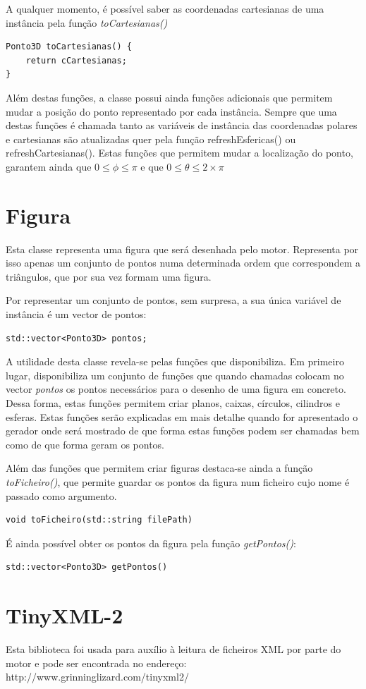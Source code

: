 A qualquer momento, é possível saber as coordenadas cartesianas de uma instância pela função \textit{toCartesianas()}

\begin{Verbatim}
Ponto3D toCartesianas() {
	return cCartesianas;
}
\end{Verbatim}

Além destas funções, a classe possui ainda funções adicionais que permitem mudar a posição do ponto representado por cada instância. Sempre que uma destas funções é chamada tanto as variáveis de instância das coordenadas polares e cartesianas são atualizadas quer pela função refreshEsfericas() ou refreshCartesianas(). Estas funções que permitem mudar a localização do ponto, garantem ainda que $0 \leq \phi \leq \pi$ e que $0 \leq \theta \leq 2 \times \pi$

\newpage

\section{Figura}

Esta classe representa uma figura que será desenhada pelo motor. Representa por isso apenas um conjunto de pontos numa determinada ordem que correspondem a triângulos, que por sua vez formam uma figura.

Por representar um conjunto de pontos, sem surpresa, a sua única variável de instância é um vector de pontos:

\begin{Verbatim}
std::vector<Ponto3D> pontos;
\end{Verbatim}

A utilidade desta classe revela-se pelas funções que disponibiliza. Em primeiro lugar, disponibiliza um conjunto de funções que quando chamadas colocam no vector \textit{pontos} os pontos necessários para o desenho de uma figura em concreto. Dessa forma, estas funções permitem criar planos, caixas, círculos, cilindros e esferas. Estas funções serão explicadas em mais detalhe quando for apresentado o gerador onde será mostrado de que forma estas funções podem ser chamadas bem como de que forma geram os pontos.

Além das funções que permitem criar figuras destaca-se ainda a função \textit{toFicheiro()}, que permite guardar os pontos da figura num ficheiro cujo nome é passado como argumento.

\begin{Verbatim}
void toFicheiro(std::string filePath)
\end{Verbatim}

É ainda possível obter os pontos da figura pela função \textit{getPontos()}:

\begin{Verbatim}
std::vector<Ponto3D> getPontos()
\end{Verbatim}

\section{TinyXML-2}

Esta biblioteca foi usada para auxílio à leitura de ficheiros XML por parte do motor e pode ser encontrada no endereço: http://www.grinninglizard.com/tinyxml2/
